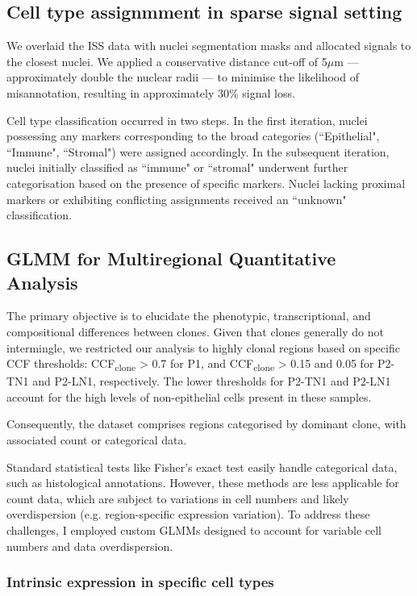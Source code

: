 \subsection{Cell type assignmment in sparse signal setting}

We overlaid the ISS data with nuclei segmentation masks and allocated signals to the closest nuclei. We applied a conservative distance cut-off of 5$\mu$m — approximately double the nuclear radii — to minimise the likelihood of misannotation, resulting in approximately 30\% signal loss.

Cell type classification occurred in two steps. In the first iteration, nuclei possessing any markers corresponding to the broad categories (``Epithelial", ``Immune", ``Stromal") were assigned accordingly. In the subsequent iteration, nuclei initially classified as ``immune" or ``stromal" underwent further categorisation based on the presence of specific markers. Nuclei lacking proximal markers or exhibiting conflicting assignments received an ``unknown" classification.

\subsection{\acs{GLMM} for Multiregional Quantitative Analysis}

The primary objective is to elucidate the phenotypic, transcriptional, and compositional differences between clones. Given that clones generally do not intermingle, we restricted our analysis to highly clonal regions based on specific \ac{CCF} thresholds: CCF\textsubscript{clone} > 0.7 for P1, and CCF\textsubscript{clone} > 0.15 and 0.05 for P2-TN1 and P2-LN1, respectively. The lower thresholds for P2-TN1 and P2-LN1 account for the high levels of non-epithelial cells present in these samples.

Consequently, the dataset comprises regions categorised by dominant clone, with associated count or categorical data.

Standard statistical tests like Fisher's exact test easily handle categorical data, such as histological annotations. However, these methods are less applicable for count data, which are subject to variations in cell numbers and likely overdispersion (e.g. region-specific expression variation). To address these challenges, I employed custom \acfp{GLMM} designed to account for variable cell numbers and data overdispersion.

\subsubsection*{Intrinsic expression in specific cell types}

